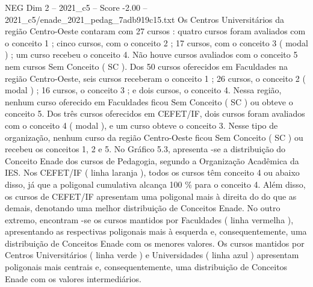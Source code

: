 \begin{textsample}{NEG Dim 2 – 2021\_c5 – Score -2.00 – 2021\_c5/enade\_2021\_pedag\_7adb919c15.txt}
Os Centros Universitários da região Centro-Oeste contaram com 27 cursos : quatro cursos foram avaliados com o conceito 1 ; cinco cursos, com o conceito 2 ; 17 cursos, com o conceito 3 ( modal ) ; um curso recebeu o conceito 4.
Não houve cursos avaliados com o conceito 5 nem cursos Sem Conceito ( SC ).
Dos 50 cursos oferecidos em Faculdades na região Centro-Oeste, seis cursos receberam o conceito 1 ; 26 cursos, o conceito 2 ( modal ) ; 16 cursos, o conceito 3 ; e dois cursos, o conceito 4.
Nessa região, nenhum curso oferecido em Faculdades ficou Sem Conceito ( SC ) ou obteve o conceito 5.
Dos três cursos oferecidos em CEFET/IF, dois cursos foram avaliados com o conceito 4 ( modal ), e um curso obteve o conceito 3.
Nesse tipo de organização, nenhum curso da região Centro-Oeste ficou Sem Conceito ( SC ) ou recebeu os conceitos 1, 2 e 5.
No Gráfico 5.3, apresenta -se a distribuição do Conceito Enade dos cursos de Pedagogia, segundo a Organização Acadêmica da IES.
Nos CEFET/IF ( linha laranja ), todos os cursos têm conceito 4 ou abaixo disso, já que a poligonal cumulativa alcança 100 \% para o conceito 4.
Além disso, os cursos de CEFET/IF apresentam uma poligonal mais à direita do do que as demais, denotando uma melhor distribuição de Conceitos Enade.
No outro extremo, encontram -se os cursos mantidos por Faculdades ( linha vermelha ), apresentando as respectivas poligonais mais à esquerda e, consequentemente, uma distribuição de Conceitos Enade com os menores valores.
Os cursos mantidos por Centros Universitários ( linha verde ) e Universidades ( linha azul ) apresentam poligonais mais centrais e, consequentemente, uma distribuição de Conceitos Enade com os valores intermediários.

\end{textsample}
